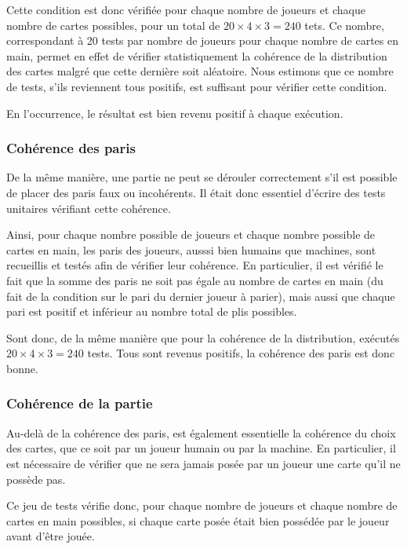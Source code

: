          Cette condition est donc vérifiée pour chaque nombre de joueurs et chaque nombre de cartes possibles, pour un total de $20\times 4\times 3 = 240$ tets.
         Ce nombre, correspondant à 20 tests par nombre de joueurs pour chaque nombre de cartes en main, permet en effet de vérifier statistiquement la cohérence de la distribution des cartes malgré que cette dernière soit aléatoire.
         Nous estimons que ce nombre de tests, s'ils reviennent tous positifs, est suffisant pour vérifier cette condition.

         En l'occurrence, le résultat est bien revenu positif à chaque exécution.

      \subsubsection{Cohérence des paris}
         De la même manière, une partie ne peut se dérouler correctement s'il est possible de placer des paris faux ou incohérents.
         Il était donc essentiel d'écrire des tests unitaires vérifiant cette cohérence.

         Ainsi, pour chaque nombre possible de joueurs et chaque nombre possible de cartes en main, les paris des joueurs, ausssi bien humains que machines, sont recueillis et testés afin de vérifier leur cohérence.
         En particulier, il est vérifié le fait que la somme des paris ne soit pas égale au nombre de cartes en main (du fait de la condition sur le pari du dernier joueur à parier), mais aussi que chaque pari est positif et inférieur au nombre total de plis possibles.

         Sont donc, de la même manière que pour la cohérence de la distribution, exécutés $20\times 4\times 3 = 240$ tests.
         Tous sont revenus positifs, la cohérence des paris est donc bonne.

      \subsubsection{Cohérence de la partie}
         Au-delà de la cohérence des paris, est également essentielle la cohérence du choix des cartes, que ce soit par un joueur humain ou par la machine.
         En particulier, il est nécessaire de vérifier que ne sera jamais posée par un joueur une carte qu'il ne possède pas.

         Ce jeu de tests vérifie donc, pour chaque nombre de joueurs et chaque nombre de cartes en main possibles, si chaque carte posée était bien possédée par le joueur avant d'être jouée.

